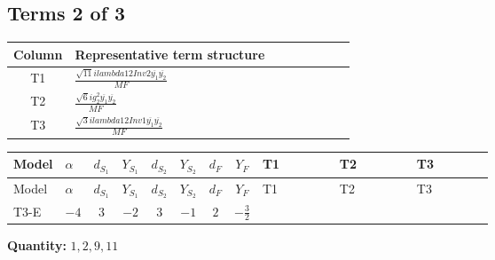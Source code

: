 \documentclass[8pt]{article}
\begin{document}
\begin{landscape}
\subsection*{Terms 2 of 3}
\begin{center}
\begin{tabular}{@{}c >{\raggedright\arraybackslash}p{0.82\linewidth}@{}}
\toprule
Column & Representative term structure \\
\midrule
T1 & \(\displaystyle \frac{\sqrt{11} i lambda12Inv2 \overline{y_{1}} \overline{y_{2}}}{MF}\) \\
\midrule
T2 & \(\displaystyle \frac{\sqrt{6} i g_{2}^{2} \overline{y_{1}} \overline{y_{2}}}{MF}\) \\
\midrule
T3 & \(\displaystyle \frac{\sqrt{3} i lambda12Inv1 \overline{y_{1}} \overline{y_{2}}}{MF}\) \\
\midrule
\bottomrule
\end{tabular}
\end{center}
\smallskip
\tiny
\begin{longtable}{@{}llcccccc >{\raggedright\arraybackslash}p{0.21\linewidth} >{\raggedright\arraybackslash}p{0.21\linewidth} >{\raggedright\arraybackslash}p{0.21\linewidth}@{}}
\toprule
Model & $\alpha$ & $d_{S_1}$ & $Y_{S_1}$ & $d_{S_2}$ & $Y_{S_2}$ & $d_F$ & $Y_F$ & T1 & T2 & T3 \\
\midrule
\endfirsthead
\toprule
Model & $\alpha$ & $d_{S_1}$ & $Y_{S_1}$ & $d_{S_2}$ & $Y_{S_2}$ & $d_F$ & $Y_F$ & T1 & T2 & T3 \\
\midrule
\endhead
T3-E & $-4$ & $3$ & $-2$ & $3$ & $-1$ & $2$ & $-\frac{3}{2}$ & \scriptsize\adjustbox{max width=\linewidth}{$\begin{gathered} - \frac{3 \sqrt{11} i lambda12Inv2 \overline{y_{1}} \overline{y_{2}}}{22 MF}\end{gathered}$} & \scriptsize\adjustbox{max width=\linewidth}{$\begin{gathered} - \frac{\sqrt{6} i g_{2}^{2} \overline{y_{1}} \overline{y_{2}}}{6 MF}\end{gathered}$} & \scriptsize\adjustbox{max width=\linewidth}{$\begin{gathered} \frac{\sqrt{3} i lambda12Inv1 \overline{y_{1}} \overline{y_{2}}}{6 MF}\end{gathered}$} \\
\midrule
\bottomrule
\end{longtable}
\clearpage
\noindent\textbf{Quantity: }$\mathrm{1,2,9,11}$\par\smallskip

\end{landscape}
\end{document}
